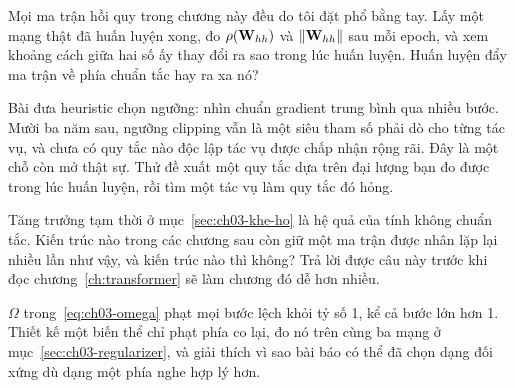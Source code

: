 \begin{bt}
  \item Mọi ma trận hồi quy trong chương này đều do tôi đặt phổ bằng tay. Lấy
    một mạng thật đã huấn luyện xong, đo \(\rho(\mathbf{W}_{hh})\) và
    \(\lVert \mathbf{W}_{hh} \rVert\) sau mỗi epoch, và xem khoảng cách giữa hai số ấy
    thay đổi ra sao trong lúc huấn luyện. Huấn luyện đẩy ma trận về phía chuẩn
    tắc hay ra xa nó?

  \item Bài đưa heuristic chọn ngưỡng: nhìn chuẩn gradient trung bình qua nhiều
    bước. Mười ba năm sau, ngưỡng clipping vẫn là một siêu tham số phải dò cho
    từng tác vụ, và chưa có quy tắc nào độc lập tác vụ được chấp nhận rộng rãi.
    Đây là một chỗ còn mở thật sự. Thử đề xuất một quy tắc dựa trên đại lượng
    bạn đo được trong lúc huấn luyện, rồi tìm một tác vụ làm quy tắc đó hỏng.

  \item Tăng trưởng tạm thời ở mục~\ref{sec:ch03-khe-ho} là hệ quả của tính
    không chuẩn tắc. Kiến trúc nào trong các chương sau còn giữ một ma trận
    được nhân lặp lại nhiều lần như vậy, và kiến trúc nào thì không? Trả lời
    được câu này trước khi đọc chương~\ref{ch:transformer} sẽ làm chương đó dễ
    hơn nhiều.

  \item \(\Omega\) trong~\eqref{eq:ch03-omega} phạt mọi bước lệch khỏi tỷ số 1,
    kể cả bước lớn hơn 1. Thiết kế một biến thể chỉ phạt phía co lại, đo nó trên
    cùng ba mạng ở mục~\ref{sec:ch03-regularizer}, và giải thích vì sao bài báo
    có thể đã chọn dạng đối xứng dù dạng một phía nghe hợp lý hơn.
\end{bt}

